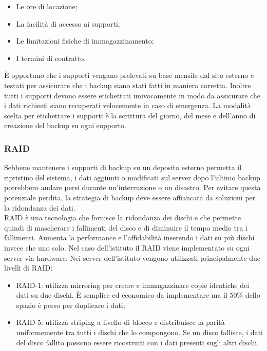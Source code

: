\documentclass[12pt, a4paper, titlepage]{report}
\begin{document}
	\begin{itemize}
		\item Le ore di locazione;
		\item La facilità di accesso ai supporti;
		\item Le limitazioni fisiche di immagazzinamento;
		\item I termini di contratto.
	\end{itemize}
	È opportuno che i supporti vengano prelevati su base mensile dal sito esterno e testati per assicurare che i backup siano stati fatti in maniera corretta. Inoltre tutti i supporti devono essere etichettati univocamente in modo da assicurare che i dati richiesti siano recuperati velocemente in caso di emergenza. La modalità scelta per etichettare i supporti è la scrittura del giorno, del mese e dell'anno di creazione del backup su ogni supporto.
	
	\subsubsection{RAID}
	
	Sebbene mantenere i supporti di backup su un deposito esterno permetta il ripristino del sistema, i dati aggiunti o modificati sul server dopo l'ultimo backup potrebbero andare persi durante un'interruzione o un disastro. Per evitare questa potenziale perdita, la strategia di backup deve essere affiancata da soluzioni per la ridondanza dei dati.\\
	RAID è una tecnologia che fornisce la ridondanza dei dischi e che permette quindi di mascherare i fallimenti del disco e di diminuire il tempo medio tra i fallimenti. Aumenta la performance e l'affidabilità inserendo i dati su più dischi invece che uno solo. Nel caso dell'istituto il RAID viene implementato su ogni server via hardware. Nei server dell'istituto vengono utilizzati principalmente due livelli di RAID:
	\begin{itemize}
		\item RAID-1: utilizza mirroring per creare e immagazzinare copie identiche dei dati su due dischi. È semplice ed economico da implementare ma il 50\% dello spazio è perso per duplicare i dati;
		\item RAID-5: utilizza striping a livello di blocco e distribuisce la parità uniformemente tra tutti i dischi che lo compongono. Se un disco fallisce, i dati del disco fallito possono essere ricostruiti con i dati presenti sugli altri dischi.
	\end{itemize}
	
\end{document}
